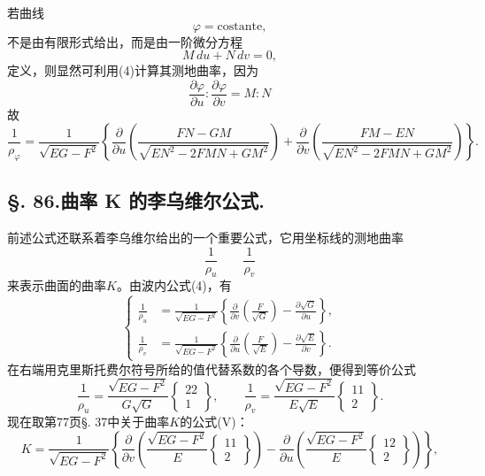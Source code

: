 若曲线
\[
 \varphi=\mathrm{costante},
\]
不是由有限形式给出，而是由一阶微分方程
\[
 M\,du+N\,dv=0,
\]
定义，则显然可利用(4)计算其测地曲率，因为
\[
 \frac{\partial\varphi}{\partial u}:\frac{\partial\varphi}{\partial v}=M:N
\]
故
\begin{equation}\tag{4*}
 \frac1{\rho_\varphi}=\frac1{\sqrt{EG-F^2}}\left\{\frac{\partial}{\partial u}\left(\frac{FN-GM}{\sqrt{EN^2-2FMN+GM^2}}\right)
 +\frac{\partial}{\partial v}\left(\frac{FM-EN}{\sqrt{EN^2-2FMN+GM^2}}\right)\right\}.
\end{equation}

\subsection*{\S. 86.\quad 曲率 K 的李乌维尔公式.}

前述公式还联系着李乌维尔给出的一个重要公式，它用坐标线的测地曲率
\[
 \frac1{\rho_u}\qquad \frac1{\rho_v}
\]
来表示曲面的曲率\(K\)。由波内公式(4)，有
\begin{equation}\tag{5}
\left\{\begin{aligned}
 \frac1{\rho_u}&=\frac1{\sqrt{EG-F^2}}\left\{\frac{\partial}{\partial v}\left(\frac{F}{\sqrt G}\right)-\frac{\partial\sqrt G}{\partial u}\right\},\\
 \frac1{\rho_v}&=\frac1{\sqrt{EG-F^2}}\left\{\frac{\partial}{\partial u}\left(\frac{F}{\sqrt E}\right)-\frac{\partial\sqrt E}{\partial v}\right\}.
\end{aligned}\right.
\end{equation}
在右端用克里斯托费尔符号所给的值代替系数的各个导数，便得到等价公式
\begin{equation}\tag{5*}
 \frac1{\rho_u}=\frac{\sqrt{EG-F^2}}{G\sqrt G}\left\{\begin{matrix}22\\1\end{matrix}\right\},
 \qquad
 \frac1{\rho_v}=\frac{\sqrt{EG-F^2}}{E\sqrt E}\left\{\begin{matrix}11\\2\end{matrix}\right\}.
\end{equation}
现在取第77页\S. 37中关于曲率\(K\)的公式(V)：
\[
 K=\frac1{\sqrt{EG-F^2}}\left\{
 \frac{\partial}{\partial v}\left(\frac{\sqrt{EG-F^2}}{E}\left\{\begin{matrix}11\\2\end{matrix}\right\}\right)
 -\frac{\partial}{\partial u}\left(\frac{\sqrt{EG-F^2}}{E}\left\{\begin{matrix}12\\2\end{matrix}\right\}\right)\right\},
\]

